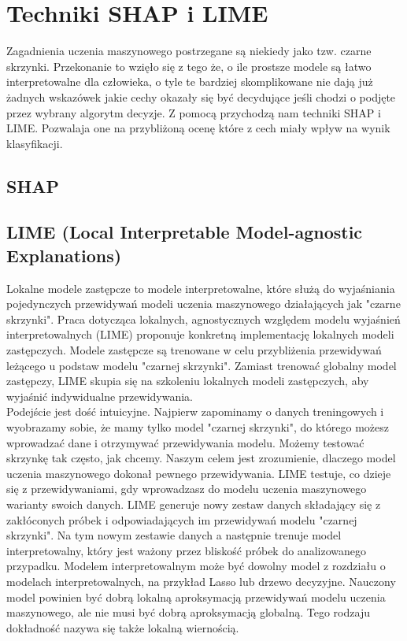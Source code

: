 \section{Techniki SHAP i LIME}
Zagadnienia uczenia maszynowego postrzegane są niekiedy jako tzw. czarne skrzynki. Przekonanie to wzięło się z tego że, o ile prostsze modele są łatwo interpretowalne dla człowieka, o tyle te bardziej skomplikowane nie dają już żadnych wskazówek jakie cechy okazały się być decydujące jeśli chodzi o podjęte przez wybrany algorytm decyzje. Z pomocą przychodzą nam techniki SHAP i LIME. Pozwalaja one na przybliżoną ocenę które z cech miały wpływ na wynik klasyfikacji.\\

\subsection{SHAP}

\subsection{LIME (Local Interpretable Model-agnostic Explanations)}

Lokalne modele zastępcze to modele interpretowalne, które służą do wyjaśniania pojedynczych przewidywań modeli uczenia maszynowego działających jak "czarne skrzynki". Praca dotycząca lokalnych, agnostycznych względem modelu wyjaśnień interpretowalnych (LIME) proponuje konkretną implementację lokalnych modeli zastępczych. Modele zastępcze są trenowane w celu przybliżenia przewidywań leżącego u podstaw modelu "czarnej skrzynki". Zamiast trenować globalny model zastępczy, LIME skupia się na szkoleniu lokalnych modeli zastępczych, aby wyjaśnić indywidualne przewidywania.\\

Podejście jest dość intuicyjne. Najpierw zapominamy o danych treningowych i wyobrazamy sobie, że mamy tylko model "czarnej skrzynki", do którego możesz wprowadzać dane i otrzymywać przewidywania modelu. Możemy testować skrzynkę tak często, jak chcemy. Naszym celem jest zrozumienie, dlaczego model uczenia maszynowego dokonał pewnego przewidywania. LIME testuje, co dzieje się z przewidywaniami, gdy wprowadzasz do modelu uczenia maszynowego warianty swoich danych. LIME generuje nowy zestaw danych składający się z zakłóconych próbek i odpowiadających im przewidywań modelu "czarnej skrzynki". Na tym nowym zestawie danych a następnie trenuje model interpretowalny, który jest ważony przez bliskość próbek do analizowanego przypadku. Modelem interpretowalnym może być dowolny model z rozdziału o modelach interpretowalnych, na przykład Lasso lub drzewo decyzyjne. Nauczony model powinien być dobrą lokalną aproksymacją przewidywań modelu uczenia maszynowego, ale nie musi być dobrą aproksymacją globalną. Tego rodzaju dokładność nazywa się także lokalną wiernością.\\


